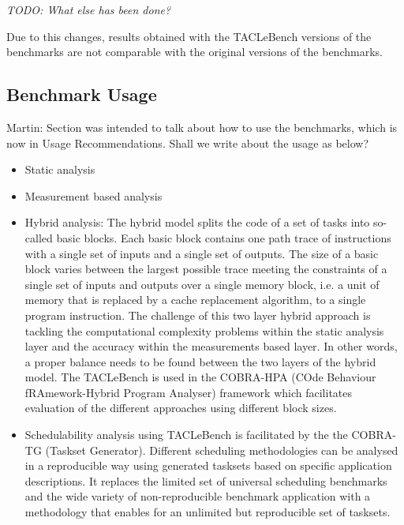 \documentclass[a4paper,UKenglish]{oasics}
\newcommand{\todo}[1]{{\emph{TODO: #1}}}
\newcommand{\martin}[1]{{\color{blue} Martin: #1}}
\begin{document}
\todo{What else has been done?}

Due to this changes, results obtained with the TACLeBench versions
of the benchmarks are not comparable with the original versions of
the benchmarks.

\subsection{Benchmark Usage}

\martin{Section was intended to talk about how to use the benchmarks, which is
now in Usage Recommendations. Shall we write about the usage as below?}

\begin{itemize}
\item Static analysis
\item Measurement based analysis
\item Hybrid analysis: The hybrid model splits the code of a set of tasks into so-
called basic blocks. Each basic block contains one path trace of instructions with a single set of inputs and a single set of outputs.  The  size  of  a  basic  block  varies  between  the  largest possible trace meeting the constraints of a single set of inputs and outputs over a single memory block, i.e. a unit of memory that is replaced by a cache replacement algorithm, to a single program instruction.
The  challenge  of  this  two  layer  hybrid  approach  is  tackling the computational complexity problems within the static analysis  layer  and  the  accuracy  within  the  measurements based  layer.  In  other  words,  a  proper  balance  needs  to  be found between the two layers of the hybrid model. The TACLeBench is used in the COBRA-HPA (COde Behaviour fRAmework-Hybrid Program Analyser) framework which facilitates evaluation of the different approaches using different block sizes.
\item Schedulability analysis using TACLeBench is facilitated by the the COBRA-TG (Taskset Generator). Different scheduling methodologies can be analysed in a reproducible way using generated tasksets based on specific application descriptions. It replaces the limited set of universal scheduling benchmarks and the wide variety of non-reproducible benchmark application with a methodology that enables for an unlimited but reproducible set of tasksets.


\end{itemize}
\end{document}
